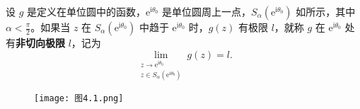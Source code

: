 \documentclass[../../main.tex]{subfiles}
\begin{document}
\begin{definition}
设 \( g \) 是定义在单位圆中的函数，\( \mathrm{e}^{\mathrm{i}\theta_0} \) 是单位圆周上一点，\( S_{\alpha}(\mathrm{e}^{\mathrm{i}\theta_0}) \) 如所示，其中 \( \alpha < \frac{\pi}{2} \)。如果当 \( z \) 在 \( S_{\alpha}(\mathrm{e}^{\mathrm{i}\theta_0}) \) 中趋于 \( \mathrm{e}^{\mathrm{i}\theta_0} \) 时，\( g(z) \) 有极限 \( l \)，就称 \( g \) 在 \( \mathrm{e}^{\mathrm{i}\theta_0} \) 处有\textbf{非切向极限} \( l \)，记为
\[
\lim_{\substack{z \to \mathrm{e}^{\mathrm{i}\theta_0} \\ z \in S_{\alpha}(\mathrm{e}^{\mathrm{i}\theta_0})}} g(z) = l.
\]
\end{definition}
\begin{figure}[H]
\centering
\texttt{[image: 图4.1.png]}
\caption{}
\label{figure:图4.1}
\end{figure}
\end{document}
